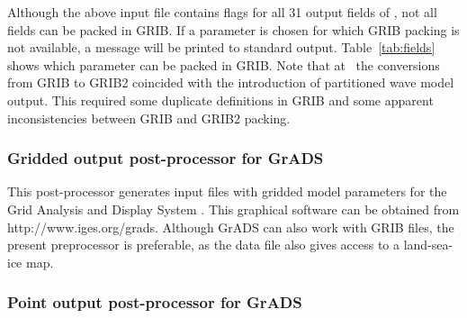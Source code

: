 Although the above input file contains flags for all 31 output fields of \ws,
not all fields can be packed in GRIB. If a parameter is chosen for which GRIB
packing is not available, a message will be printed to standard
output. Table~\ref{tab:fields} shows which parameter can be packed in GRIB.
Note that at \ncep\ the conversions from GRIB to GRIB2 coincided with the
introduction of partitioned wave model output. This required some duplicate
definitions in GRIB and some apparent inconsistencies between GRIB and GRIB2
packing.


\pb
\vsssub
\subsubsection{Gridded output post-processor for GrADS} \label{sec:post_gf}
\vsssub



\vspace{\baselineskip} 
\noindent 
This post-processor generates input files with gridded model parameters for
the Grid Analysis and Display System \citep[GrADS,][]{man:GrADS}. This
graphical software can be obtained from http://www.iges.org/grads. Although
GrADS can also work with GRIB files, the present preprocessor is preferable,
as the data file also gives access to a land-sea-ice map.


\pb
\vsssub
\subsubsection{Point output post-processor for GrADS} \label{sec:post_gp}
\vsssub


